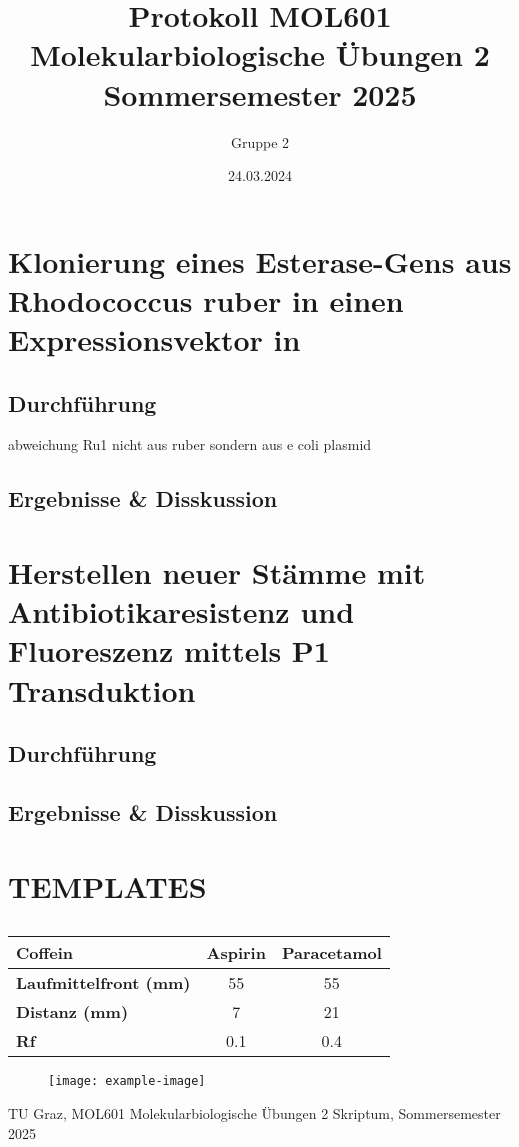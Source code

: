 \documentclass[11pt]{article}
\title{Protokoll MOL601 Molekularbiologische Übungen 2 \\
Sommersemester 2025}
\author{Gruppe 2}
\date{24.03.2024}
\begin{document}
\maketitle

\section{Klonierung eines Esterase-Gens aus Rhodococcus ruber in einen Expressionsvektor in \ecoli}
\subsection{Durchführung}
abweichung Ru1 nicht aus ruber sondern aus e coli plasmid
\subsection{Ergebnisse \& Disskussion}


\section{Herstellen neuer \ecoli Stämme mit Antibiotikaresistenz und Fluoreszenz mittels P1 Transduktion}
\subsection{Durchführung}
\subsection{Ergebnisse \& Disskussion}


\section{TEMPLATES}
\begin{table}[h!]
    \centering
    \caption{\textbf{
    }}
    \begin{tabular}{lcc}
    \toprule
    \textbf{Coffein} & \textbf{Aspirin} & \textbf{Paracetamol} \\
    \midrule
    \textbf{Laufmittelfront (mm)} & 55  & 55  \\
    \textbf{Distanz (mm)}         & 7   & 21  \\
    \midrule
    \textbf{Rf}                   & 0.1 & 0.4 \\
    \bottomrule
    \end{tabular}
    \caption*{\small
    }
    \label{tab:template}
\end{table}

\begin{figure}[h!]
    \centering
    \texttt{[image: example-image]}
    \caption{\small
    }
    \label{fig:template}
\end{figure}


\begin{thebibliography}{9}

    TU Graz, MOL601 Molekularbiologische Übungen 2 Skriptum, Sommersemester 2025

\end{thebibliography}
\end{document}
